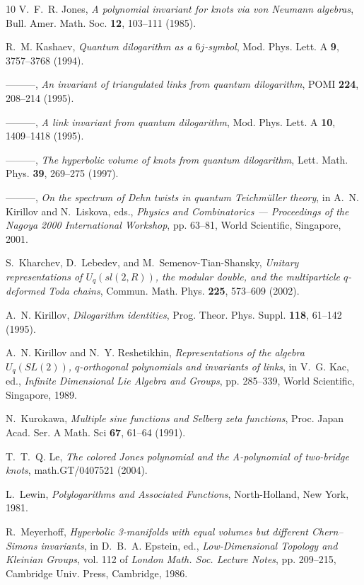 \documentclass[12pt,reqno]{amsart}
\numberwithin{equation}{section}
\begin{document}
\begin{thebibliography}{10}
V.~F.~R. Jones, \emph{A polynomial invariant for knots via von {Neumann}
  algebras}, Bull. Amer. Math. Soc. \textbf{12}, 103--111 (1985).

R.~M. Kashaev, \emph{Quantum dilogarithm as a $6j$-symbol}, Mod. Phys. Lett. A
  \textbf{9}, 3757--3768 (1994).

---{}---{}---, \emph{An invariant of triangulated links from quantum
  dilogarithm}, POMI \textbf{224}, 208--214 (1995).

---{}---{}---, \emph{A link invariant from quantum dilogarithm}, Mod. Phys.
  Lett. A \textbf{10}, 1409--1418 (1995).

---{}---{}---, \emph{The hyperbolic volume of knots from quantum dilogarithm},
  Lett. Math. Phys. \textbf{39}, 269--275 (1997).

---{}---{}---, \emph{On the spectrum of {Dehn} twists in quantum
  {Teichm{\"u}ller} theory}, in A.~N. Kirillov and N.~Liskova, eds.,
  \emph{Physics and Combinatorics --- Proceedings of the Nagoya 2000
  International Workshop}, pp. 63--81, World Scientific, Singapore, 2001.

S.~Kharchev, D.~Lebedev, and M.~Semenov-Tian-Shansky, \emph{Unitary
  representations of {$U_q(sl(2,R))$}, the modular double, and the
  multiparticle $q$-deformed {Toda} chains}, Commun. Math. Phys. \textbf{225},
  573--609 (2002).

A.~N. Kirillov, \emph{Dilogarithm identities}, Prog. Theor. Phys. Suppl.
  \textbf{118}, 61--142 (1995).

A.~N. Kirillov and N.~Y. Reshetikhin, \emph{Representations of the algebra
  {$U_q(SL(2))$}, $q$-orthogonal polynomials and invariants of links}, in V.~G.
  Kac, ed., \emph{Infinite Dimensional Lie Algebra and Groups}, pp. 285--339,
  World Scientific, Singapore, 1989.

N.~Kurokawa, \emph{Multiple sine functions and {Selberg} zeta functions}, Proc.
  Japan Acad. Ser. A Math. Sci \textbf{67}, 61--64 (1991).

T.~T.~Q. Le, \emph{The colored {Jones} polynomial and the {A}-polynomial of
  two-bridge knots}, math.GT/0407521  (2004).

L.~Lewin, \emph{Polylogarithms and Associated Functions}, North-Holland, New
  York, 1981.

R.~Meyerhoff, \emph{Hyperbolic 3-manifolds with equal volumes but different
  {Chern--Simons} invariants}, in D.~B.~A. Epstein, ed., \emph{Low-Dimensional
  Topology and Kleinian Groups}, vol. 112 of \emph{London Math. Soc. Lecture
  Notes}, pp. 209--215, Cambridge Univ. Press, Cambridge, 1986.


\end{thebibliography}
\end{document}
